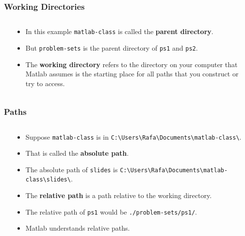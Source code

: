\documentclass[11pt,xcolor={svgnames},aspectratio=169,usepdftitle=false]{beamer}
\begin{document}
\begin{frame}[fragile]
    \frametitle{Working Directories}
\begin{columns}
    \begin{column}{0.2\textwidth}
    \end{column}
    \begin{column}{0.8\textwidth}
        \begin{itemize}
            \item In this example \verb;matlab-class; is called the \alert{\textbf{parent directory}}.
            \item But \verb;problem-sets; is the parent directory of \verb;ps1; and \verb;ps2;.
            \item The \alert{\textbf{working directory}} refers to the directory on your computer that Matlab assumes is the starting place for all paths that you construct or try to access.
        \end{itemize}
    \end{column}
\end{columns}
\end{frame}

\begin{frame}[fragile]
    \frametitle{Paths}
\begin{columns}
    \begin{column}{0.2\textwidth}
    \end{column}
    \begin{column}{0.8\textwidth}
        \begin{itemize}
            \item Suppose \verb;matlab-class; is in \verb;C:\Users\Rafa\Documents\matlab-class\;.
            \item That is called the \alert{\textbf{absolute path}}.
            \item The absolute path of \verb;slides; is \verb;C:\Users\Rafa\Documents\matlab-class\slides\;.
            \item The \alert{\textbf{relative path}} is a path relative to the working directory.
            \item The relative path of \verb;ps1; would be \verb;./problem-sets/ps1/;.
            \item Matlab understands relative paths.
        \end{itemize}
    \end{column}
\end{columns}
\end{frame}
\end{document}
